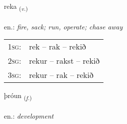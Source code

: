 \documentclass[frontgrid, backgrid]{flacards}\usepackage[]{graphicx}\usepackage[]{xcolor}
\begin{document}
\renewcommand{\blhead}{\vskip5pt {\small\bfseries\footnotesize Sagnorð | Verb }}
\renewcommand{\bcfoot}{\vskip5pt \hspace{2pt}{\small\bfseries\footnotesize 1K}}


{reka \small{\textsubscript{(\textit{v.})}} \\[1ex] %
\textphonetic{[rɛːka]} \\
en.: \emph{fire, sack; run, operate; chase away} \\  [2ex]
\renewcommand*{\arraystretch}{0.8}
\begin{tabular}{p{1cm}l}
\textsc{1sg}: & rek -- rak -- rekið \\ 
\textsc{2sg}: & rekur -- rakst -- rekið \\ 
\textsc{3sg}: & rekur -- rak -- rekið \\ 
\end{tabular}
}

\renewcommand{\flhead}{\vskip5pt \fboxsep=0pt {\small\bfseries\footnotesize Nafnorð | Noun}}
\renewcommand{\fcfoot}{\vskip5pt \fboxsep=0pt \hspace{2pt}{\small\bfseries\footnotesize 1K}}

\renewcommand{\blhead}{\vskip5pt {\small\bfseries\footnotesize Nafnorð | Noun }}
\renewcommand{\bcfoot}{\vskip5pt \hspace{2pt}{\small\bfseries\footnotesize 1K}}


{þróun \small{\textsubscript{(\textit{f.})}} \\[1ex] %
\textphonetic{[θrouːʏn]} \\
en.: \emph{development} \\  [2ex]
\renewcommand*{\arraystretch}{0.8}
}

\end{document}
